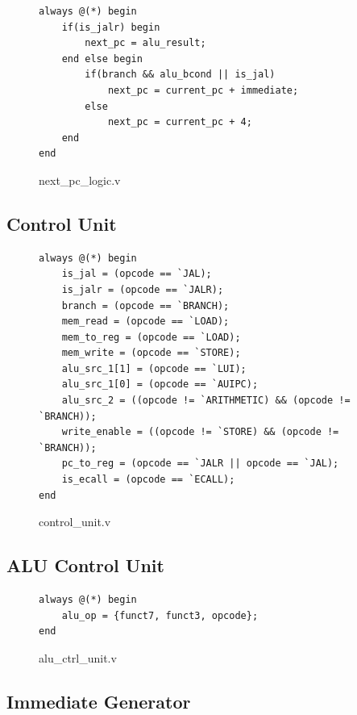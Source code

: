 \documentclass[openright, a4paper]{article}
\begin{document}
\begin{figure}[h]
    \begin{verbatim}
always @(*) begin
    if(is_jalr) begin
        next_pc = alu_result;
    end else begin
        if(branch && alu_bcond || is_jal)
            next_pc = current_pc + immediate;
        else
            next_pc = current_pc + 4;
    end
end
    \end{verbatim}
    \caption{next_pc_logic.v}
\end{figure}

\subsection{Control Unit}

\begin{figure}[!h]
    \begin{verbatim}
always @(*) begin
    is_jal = (opcode == `JAL);
    is_jalr = (opcode == `JALR);
    branch = (opcode == `BRANCH);
    mem_read = (opcode == `LOAD);
    mem_to_reg = (opcode == `LOAD);
    mem_write = (opcode == `STORE);
    alu_src_1[1] = (opcode == `LUI);
    alu_src_1[0] = (opcode == `AUIPC);
    alu_src_2 = ((opcode != `ARITHMETIC) && (opcode != `BRANCH));
    write_enable = ((opcode != `STORE) && (opcode != `BRANCH));
    pc_to_reg = (opcode == `JALR || opcode == `JAL);
    is_ecall = (opcode == `ECALL);
end
    \end{verbatim}
    \caption{control_unit.v}
\end{figure}

\newpage

\subsection{ALU Control Unit}

\begin{figure}[!h]
    \begin{verbatim}
always @(*) begin
    alu_op = {funct7, funct3, opcode};
end
    \end{verbatim}
    \caption{alu_ctrl_unit.v}
\end{figure}

\subsection{Immediate Generator}
\end{document}
